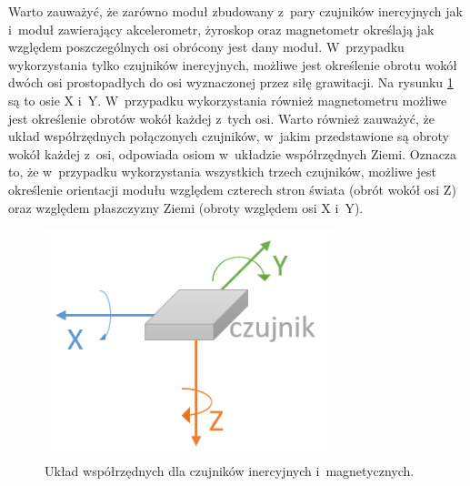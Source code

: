 Warto zauważyć, że zarówno moduł zbudowany z~pary czujników inercyjnych jak i~moduł zawierający akcelerometr, żyroskop oraz magnetometr określają jak względem poszczególnych osi obrócony jest dany moduł. W~przypadku wykorzystania tylko czujników inercyjnych, możliwe jest określenie obrotu wokół dwóch osi prostopadłych do osi wyznaczonej przez siłę grawitacji. Na rysunku \ref{fig:literature:imu:coordination} są to osie X i~Y. W~przypadku wykorzystania również magnetometru możliwe jest określenie obrotów wokół każdej z~tych osi. Warto również zauważyć, że układ współrzędnych połączonych czujników, w~jakim przedstawione są obroty wokół każdej z~osi, odpowiada osiom w~układzie współrzędnych Ziemi. Oznacza to, że w~przypadku wykorzystania wszystkich trzech czujników, możliwe jest określenie orientacji modułu względem czterech stron świata (obrót wokół osi Z) oraz względem płaszczyzny Ziemi (obroty względem osi X i~Y).
			
\begin{savenotes}
	\begin{figure}[!htp]
		\centering	
		\includegraphics[width=0.75\textwidth]{images/IMUAxes.png}
		\caption{Układ współrzędnych dla czujników inercyjnych i~magnetycznych.}
		\label{fig:literature:imu:coordination}
	\end{figure}
\end{savenotes}
					
